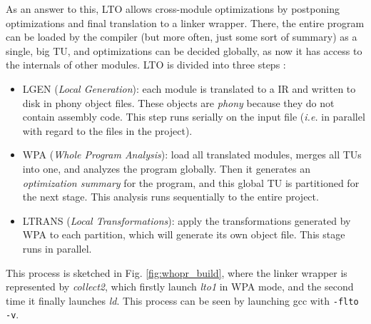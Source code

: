 \documentclass[runningheads]{llncs}
\begin{document}
As an answer to this, LTO allows cross-module optimizations by
postponing optimizations and final translation to a linker wrapper. There, the entire
program can be loaded by the compiler (but more often, just some sort of summary)
as a single, big TU, and optimizations can be decided globally,
as now it has access to the internals of other modules. LTO is divided into
three steps \cite{whoprgoogle,glek2010optimizing}:
\begin{itemize}
\item LGEN (\textit{Local Generation}): each module is translated to a IR and
written to disk in phony object files. These objects are \emph{phony} because
they do not contain assembly code. This step runs serially on the input file
(\textit{i.e.} in parallel with regard to the files in the project).

\item WPA (\textit{Whole Program Analysis}): load all translated modules, merges
all TUs into one, and analyzes the program globally.
Then it generates an \emph{optimization summary} for the program, and this global
TU is partitioned for the next stage. This analysis runs sequentially
to the entire project.

\item LTRANS (\textit{Local Transformations}): apply the transformations generated by
WPA to each partition, which will generate its own object file. This stage runs in
parallel.
\end{itemize}

This process is sketched in Fig. \ref{fig:whopr_build}, where the linker
wrapper is represented by \textit{collect2}, which firstly launch \textit{lto1}
in WPA mode, and the second time it finally launches \textit{ld}. This process
can be seen by launching gcc with \texttt{-flto -v}.
\end{document}
